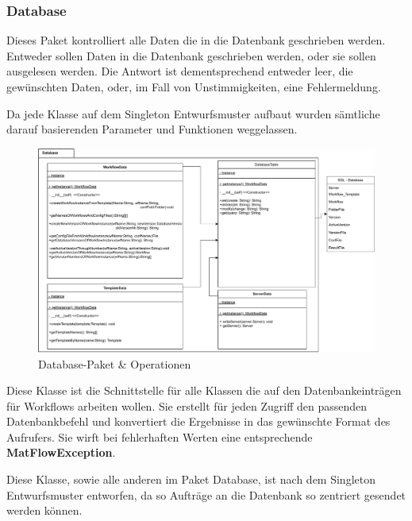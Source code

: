 \subsubsection{\label{database} Database}
Dieses Paket kontrolliert alle Daten die in die Datenbank geschrieben werden.
Entweder sollen Daten in die Datenbank geschrieben werden, oder sie sollen ausgelesen werden. Die Antwort ist dementsprechend entweder leer, die gewünschten Daten, oder, im Fall von Unstimmigkeiten, eine Fehlermeldung.

Da jede Klasse auf dem Singleton Entwurfsmuster aufbaut wurden sämtliche darauf basierenden Parameter und Funktionen weggelassen.

\begin{figure}[h]
	\centering
	\includegraphics[width=1\textwidth]{res/Database_Package.pdf} 
	\caption{Database-Paket \& Operationen}
	\label{fig:fig:database_package}
\end{figure}


Diese Klasse ist die Schnittstelle für alle Klassen die auf den Datenbankeinträgen für Workflows arbeiten wollen. Sie erstellt für jeden Zugriff den passenden Datenbankbefehl und konvertiert die Ergebnisse in das gewünschte Format des Aufrufers.
Sie wirft bei fehlerhaften Werten eine entsprechende \textbf{MatFlowException}.

Diese Klasse, sowie alle anderen im Paket Database, ist nach dem Singleton Entwurfsmuster entworfen, da so Aufträge an die Datenbank so zentriert gesendet werden können.


